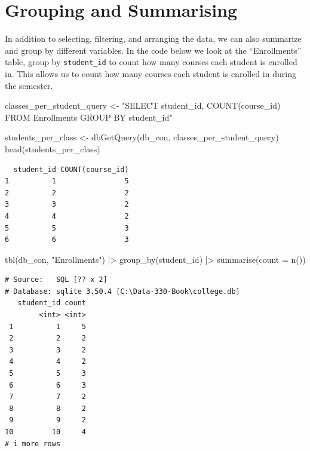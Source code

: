 \documentclass[
  letterpaper,
  DIV=11,
  numbers=noendperiod]{scrreprt}
\newenvironment{Shaded}{\begin{snugshade}}{\end{snugshade}}
\newcommand{\AttributeTok}[1]{\textcolor[rgb]{0.40,0.45,0.13}{#1}}
\newcommand{\FunctionTok}[1]{\textcolor[rgb]{0.28,0.35,0.67}{#1}}
\newcommand{\NormalTok}[1]{\textcolor[rgb]{0.00,0.23,0.31}{#1}}
\newcommand{\OtherTok}[1]{\textcolor[rgb]{0.00,0.23,0.31}{#1}}
\newcommand{\SpecialCharTok}[1]{\textcolor[rgb]{0.37,0.37,0.37}{#1}}
\newcommand{\StringTok}[1]{\textcolor[rgb]{0.13,0.47,0.30}{#1}}
\begin{document}
\section{Grouping and Summarising}\label{grouping-and-summarising}

In addition to selecting, filtering, and arranging the data, we can also
summarize and group by different variables. In the code below we look at
the ``Enrollments'' table, group by \texttt{student\_id} to count how
many courses each student is enrolled in. This allows us to count how
many courses each student is enrolled in during the semester.

\begin{Shaded}
\begin{Highlighting}[]
\NormalTok{classes\_per\_student\_query }\OtherTok{\textless{}{-}} \StringTok{"SELECT student\_id, COUNT(course\_id)}
\StringTok{                              FROM Enrollments}
\StringTok{                              GROUP BY student\_id"}

\NormalTok{students\_per\_class }\OtherTok{\textless{}{-}} \FunctionTok{dbGetQuery}\NormalTok{(db\_con, classes\_per\_student\_query)}
\FunctionTok{head}\NormalTok{(students\_per\_class)}
\end{Highlighting}
\end{Shaded}

\begin{verbatim}
  student_id COUNT(course_id)
1          1                5
2          2                2
3          3                2
4          4                2
5          5                3
6          6                3
\end{verbatim}

\begin{Shaded}
\begin{Highlighting}[]
\FunctionTok{tbl}\NormalTok{(db\_con, }\StringTok{"Enrollments"}\NormalTok{) }\SpecialCharTok{|\textgreater{}} 
  \FunctionTok{group\_by}\NormalTok{(student\_id) }\SpecialCharTok{|\textgreater{}}
  \FunctionTok{summarise}\NormalTok{(}\AttributeTok{count =} \FunctionTok{n}\NormalTok{())}
\end{Highlighting}
\end{Shaded}

\begin{verbatim}
# Source:   SQL [?? x 2]
# Database: sqlite 3.50.4 [C:\Data-330-Book\college.db]
   student_id count
        <int> <int>
 1          1     5
 2          2     2
 3          3     2
 4          4     2
 5          5     3
 6          6     3
 7          7     2
 8          8     2
 9          9     2
10         10     4
# i more rows
\end{verbatim}
\end{document}

